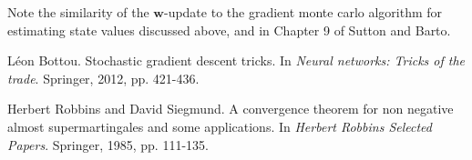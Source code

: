 \documentclass[11pt]{article}
\theoremstyle{plain} %
\theoremstyle{remark}
\begin{document}
Note the similarity of the $\boldsymbol{w}$-update to the gradient monte carlo
algorithm for estimating state values discussed above, and in Chapter 9 of
Sutton and Barto. 

\begin{thebibliography}{99}

  Léon Bottou.
  \newblock Stochastic gradient descent tricks.
  \newblock In \emph{Neural networks: Tricks of the trade}.
  \newblock Springer, 2012, pp. 421-436.
  
  Herbert Robbins and David Siegmund.
  \newblock A convergence theorem for non negative almost supermartingales and some applications.
  \newblock In \emph{Herbert Robbins Selected Papers}.
  \newblock Springer, 1985, pp. 111-135.
  
  \end{thebibliography}
  
\end{document}
